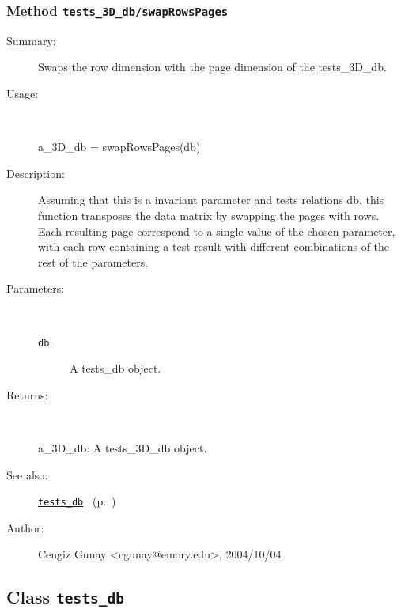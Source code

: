 \subsubsection[Method \texttt{swapRowsPages}]{Method \texttt{tests\_3D\_db/swapRowsPages}}%
%
\label{ref_tests_3D_db__swapRowsPages}%
\hypertarget{ref_tests_3D_db__swapRowsPages}{}%
\begin{description}
\item[Summary:]Swaps the row dimension with the page dimension of the
		  tests\_3D\_db.
%
\item[Usage:]~%
\begin{lyxcode}%
a\_3D\_db = swapRowsPages(db)
%
\end{lyxcode}%
%
\item[Description:]%
Assuming that this is a invariant parameter and tests relations db, this
 function transposes the data matrix by swapping the pages with rows. Each
 resulting page correspond to a single value of the chosen parameter, with
 each row containing a test result with different combinations of the rest
 of the parameters.
\item[Parameters:]~
\begin{description}%
\item[\texttt{db}:]
 A tests\_db object.
\end{description}%
%
\item[Returns:
]~

	a\_3D\_db: A tests\_3D\_db object.
%
%
\item[See also:]%
\hyperlink{ref_tests_db}{\texttt{tests\_db}}%
\ (p.~\pageref{ref_tests_db})%
%
%
\item[Author:]%
Cengiz Gunay <cgunay@emory.edu>, 2004/10/04
%
\end{description}
\methodline%
\subsection{Class \texttt{tests\_db}}%
%
\label{ref_tests_db}%
\hypertarget{ref_tests_db}{}%

